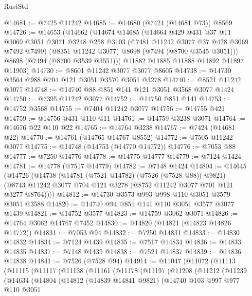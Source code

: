 \begin{lexlean}{RustStd}
\begin{coremodule}
@14681 := @7425 @11242
@14685 := @14680 (@7424 (@14681 @73)) @8569
@14726 := @14653
    (@14662
      (@14674
        @14685
        (@14664
          @429
          @431
          @37
          @11
          @3069
          @3051
          @3071
          @3248
          @258
          @3103
          (@7481 @11242 @3077 @37 @428 @3069 @7492 @7499)
          (@8351 @11242 @3077)
          @8698
          (@7494 (@8700 @3545 @3051)))
        @8698
        (@7494 (@8700 @3539 @3551)))
      @11882
      @11885
      @11888
      @11892
      @11897
      @11903)
@14730 := @8601 @11242 @3077 @3077 @8605
@14738 := @14730 @3564 @988 @704 @121 @3051 @3570 @3051 @3278
@14740 := @8521 @11242 @3077
@14748 := @14740 @88 @851 @141 @121 @3051 @3568 @3077 @1424
@14750 := @7395 @11242 @3077
@14752 := @14750 @851 @141
@14753 := @14752 @3568
@14755 := @7404 @11242 @3077
@14756 := @14755 @421
@14759 := @14756 @431 @110 @11
@14761 := @14759 @3238 @3071
@14764 := @14676 @22 @110 @22
@14765 := @14764 @3238
@14767 := @7424 (@14681 @22)
@14770 := @14761 (@14765 @14767 @8552)
@14772 := @7505 @11242 @3077
@14775 := @14748 (@14753 (@14770 @14772))
@14776 := @7053 @88
@14777 := @7250 @14776
@14778 := @14775 @14777
@14779 := @7124 @1424
@14781 := @14778 (@7517 @14779)
@14782 := @7148 @1424
@14804 := @14645
    (@14726
      (@14738
        (@14781 (@7521 @14782) (@7526 (@7528 @88)) @9821)
        (@8743 @11242 @3077 @704 @121 @3278 (@8752 @11242 @3077 @701 @121 @3277 @8764))))
@14812 := @14730 @3573 @993 @998 @110 @3051 @3579 @3051 @3588
@14820 := @14740 @94 @851 @141 @110 @3051 @3577 @3077 @1439
@14821 := @14752 @3577
@14823 := @14759 @3062 @3071
@14826 := @14764 @3062 @14767 @7452
@14830 := @14820 (@14821 (@14823 @14826 @14772))
@14831 := @7053 @94
@14832 := @7250 @14831
@14833 := @14830 @14832
@14834 := @7124 @1439
@14835 := @7517 @14834
@14836 := @14833 @14835
@14837 := @7148 @1439
@14838 := @7521 @14837
@14839 := @14836 @14838
@14841 := @7526 (@7528 @94)
@14914 := @11047
    (@11072
      (@11113
        (@11115
          (@11117
            (@11138
              (@11161
                (@11178
                  (@11197
                    (@11208
                      (@11212
                        (@11239
                          (@14634
                            (@14804
                              (@14812
                                (@14839 @14841 @9821)
                                (@14740
                                  @103
                                  @997
                                  @977
                                  @110
                                  @3051

\end{coremodule}
\end{lexlean}
